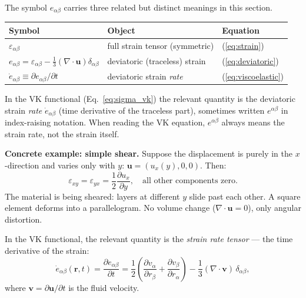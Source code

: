 \documentclass[12pt,letterpaper]{article}
\theoremstyle{definition}
\begin{document}
\begin{tcolorbox}[colback=yellow!6!white, colframe=orange!70!black,
  fonttitle=\bfseries\small, title={Notation: Three Roles of $e_{\alpha\beta}$},
  breakable]
The symbol $e_{\alpha\beta}$ carries three related but distinct meanings in
this section.
\begin{center}
\renewcommand{\arraystretch}{1.3}
\begin{tabular}{@{}lll@{}}
\toprule
Symbol & Object & Equation \\
\midrule
$\varepsilon_{\alpha\beta}$ & full strain tensor (symmetric) & (\ref{eq:strain}) \\
$e_{\alpha\beta} = \varepsilon_{\alpha\beta} - \tfrac{1}{3}(\nabla\!\cdot\!\bm{u})\delta_{\alpha\beta}$
  & deviatoric (traceless) strain & (\ref{eq:deviatoric}) \\
$\dot{e}_{\alpha\beta} \equiv \partial e_{\alpha\beta}/\partial t$
  & deviatoric strain \emph{rate} & (\ref{eq:viscoelastic}) \\
\bottomrule
\end{tabular}
\renewcommand{\arraystretch}{1}
\end{center}
In the VK functional (Eq.~\ref{eq:sigma_vk}) the relevant quantity is the
deviatoric strain \emph{rate} $\dot{e}_{\alpha\beta}$ (time derivative of the
traceless part), sometimes written $e^{\alpha\beta}$ in index-raising notation.
When reading the VK equation, $e^{\alpha\beta}$ always means the strain rate,
not the strain itself.
\end{tcolorbox}

\begin{derivbox}
\textbf{Concrete example: simple shear.}
Suppose the displacement is purely in the $x$-direction and varies
only with $y$: $\bm{u} = (u_x(y), 0, 0)$.  Then:
\[
  \varepsilon_{xy} = \varepsilon_{yx} = \frac{1}{2}\frac{\partial u_x}{\partial y},
  \quad \text{all other components zero.}
\]
The material is being sheared: layers at different $y$ slide past each
other.  A square element deforms into a parallelogram.  No volume change
($\nabla\cdot\bm{u}=0$), only angular distortion.
\end{derivbox}

In the VK functional, the relevant quantity is the \emph{strain rate
tensor} --- the time derivative of the strain:
\begin{equation}
  \dot{e}_{\alpha\beta}(\bm{r},t)
  = \frac{\partial e_{\alpha\beta}}{\partial t}
  = \frac{1}{2}\left(\frac{\partial v_\alpha}{\partial r_\beta}
                   + \frac{\partial v_\beta}{\partial r_\alpha}\right)
  - \frac{1}{3}(\nabla\cdot\bm{v})\,\delta_{\alpha\beta},
  \label{eq:strain_rate}
\end{equation}
where $\bm{v} = \partial\bm{u}/\partial t$ is the fluid velocity.
\end{document}
